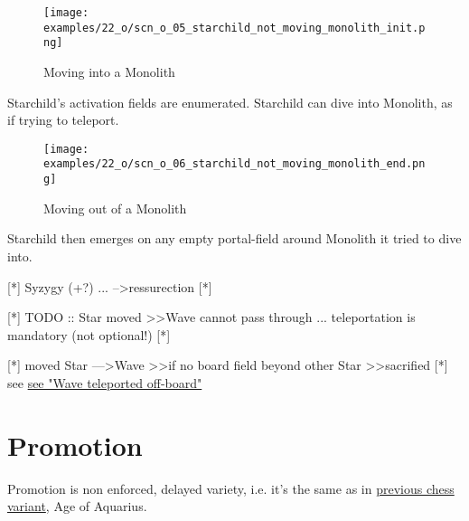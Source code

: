 \vspace*{-0.9\baselineskip}
\noindent
\begin{wrapfigure}[4]{l}{0.4\textwidth}
\centering
\texttt{[image: examples/22\_o/scn\_o\_05\_starchild\_not\_moving\_monolith\_init.png]}
\caption{Moving into a Monolith}
\label{fig:scn_o_05_starchild_not_moving_monolith_init}
\end{wrapfigure}
Starchild’s activation fields are enumerated. Starchild can dive into Monolith, as if trying
to teleport.

\vspace*{3.9\baselineskip}
\noindent
\begin{wrapfigure}[3]{l}{0.4\textwidth}
\centering
\texttt{[image: examples/22\_o/scn\_o\_06\_starchild\_not\_moving\_monolith\_end.png]}
\caption{Moving out of a Monolith}
\label{fig:scn_o_06_starchild_not_moving_monolith_end}
\end{wrapfigure}
Starchild then emerges on any empty portal-field around Monolith it tried to dive into.

\clearpage %

[*] Syzygy (+?) ... --\textgreater ressurection [*]

[*] TODO :: Star moved \textgreater\textgreater Wave cannot pass through ... teleportation is mandatory (not optional!) [*]

[*] moved Star ---\textgreater Wave \textgreater\textgreater if no board field beyond other Star \textgreater\textgreater sacrified [*]
see \hyperref[fig:scn_d_11_wave_teleported_off_board]{see "Wave teleported off-board"}

\clearpage %

\section*{Promotion}

Promotion is non enforced, delayed variety, i.e. it's the same as in
\hyperref[sec:Age of Aquarius/Promotion]{previous chess variant}, Age of Aquarius.

